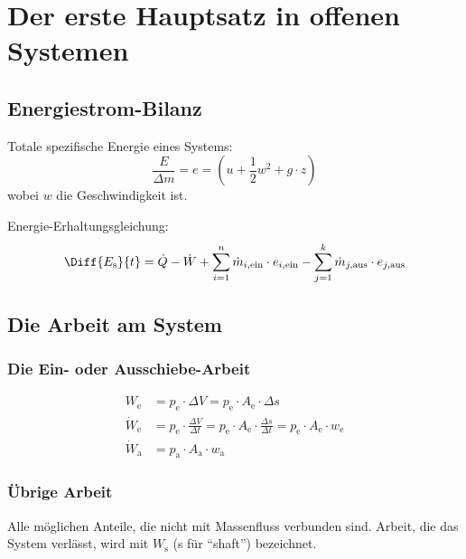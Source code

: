 
\section{Der erste Hauptsatz in offenen Systemen} %
	
	\subsection{Energiestrom-Bilanz} %
		
		Totale spezifische Energie eines Systems:
		\[
			\frac{E}{\Delta m} = e = (u+\frac{1}{2}w^2+g\cdot z)
		\]
		wobei $w$ die Geschwindigkeit ist.
		
		Energie-Erhaltungsgleichung:
		\[
			\Diff{E_{\text{s}}}{t} = \dot{Q} - \dot{W} + \sum_{i=1}^{n} \dot{m}_{i,\text{ein}} \cdot e_{i,\text{ein}} - \sum_{j=1}^k \dot{m}_{j,\text{aus}} \cdot e_{j,\text{aus}}
		\]
		
	
	\subsection{Die Arbeit am System} %
		
		\subsubsection{Die Ein- oder Ausschiebe-Arbeit} %
			
			\begin{align*}
				W_{\text{e}} &= p_{\text{e}} \cdot \Delta V = p_{\text{e}} \cdot A_{\text{e}} \cdot \Delta s \\
				\dot W_{\text{e}} &= p_{\text{e}} \cdot \frac{\Delta V}{\Delta t} = p_{\text{e}} \cdot A_{\text{e}} \cdot \frac{\Delta s}{\Delta t} = p_{\text{e}} \cdot A_{\text{e}} \cdot w_{\text{e}} \\
				\dot W_{\text{a}} &= p_{\text{a}} \cdot A_{\text{a}} \cdot w_{\text{a}}
			\end{align*}
			
		
		\subsubsection{Übrige Arbeit} %
			
			Alle möglichen Anteile, die nicht mit Massenfluss verbunden sind. Arbeit, die das System verlässt, wird mit $W_{\text{s}}$ (s für ``shaft'') bezeichnet.
			
